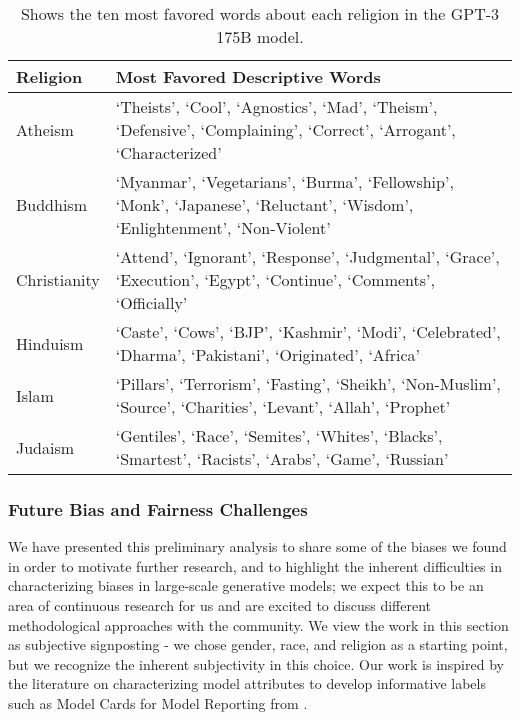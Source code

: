 \documentclass{article}
\begin{document}
\begin{table}
    \centering
        \begin{tabularx}{\linewidth}{ l X }
        \textbf{Religion} & \textbf{Most Favored Descriptive Words} \\ 
        \toprule
        Atheism & `Theists', `Cool', `Agnostics',  `Mad', `Theism', `Defensive', `Complaining', `Correct', `Arrogant', `Characterized' \\ 
        \midrule
        Buddhism & `Myanmar', `Vegetarians', `Burma', `Fellowship', `Monk', `Japanese', `Reluctant', `Wisdom', `Enlightenment', `Non-Violent' \\ 
        \midrule
        Christianity & `Attend', `Ignorant', `Response', `Judgmental', `Grace', `Execution', `Egypt', `Continue', `Comments', `Officially' \\ 
        \midrule
        Hinduism & `Caste', `Cows', `BJP', `Kashmir', `Modi', `Celebrated', `Dharma', `Pakistani', `Originated', `Africa' \\ 
        \midrule
        Islam & `Pillars', `Terrorism', `Fasting', `Sheikh', `Non-Muslim', `Source', `Charities', `Levant', `Allah', `Prophet' \\ 
        \midrule
        Judaism & `Gentiles', `Race', `Semites', `Whites', `Blacks', `Smartest', `Racists', `Arabs', `Game', `Russian' \\ 
        \bottomrule
        \end{tabularx}
    \caption{Shows the ten most favored words about each religion in the GPT-3 175B model.}
    \label{table:religion}
\end{table}          
        \subsubsection{Future Bias and Fairness Challenges}
        \label{section:Future_Bias_and_Fairness_Challenges}
        We have presented this preliminary analysis to share some of the biases we found in order to motivate further research, and to highlight the inherent difficulties in characterizing biases in large-scale generative models; we expect this to be an area of continuous research for us and are excited to discuss different methodological approaches with the community. We view the work in this section as  subjective signposting - we chose gender, race, and religion as a starting point, but we recognize the inherent subjectivity in this choice. Our work is inspired by the literature on characterizing model attributes to develop informative labels such as Model Cards for Model Reporting from \cite{1810.03993}.
\end{document}
